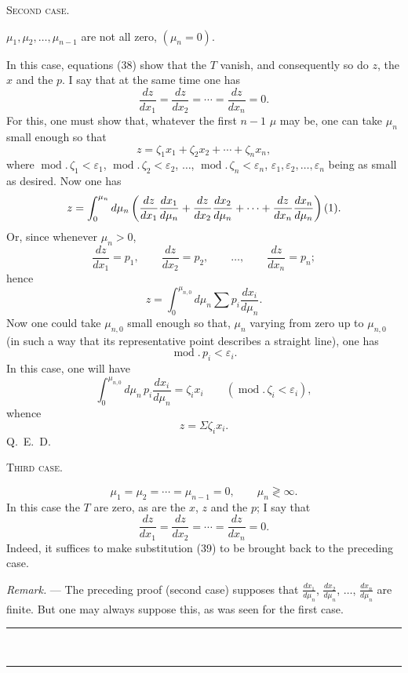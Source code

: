 \documentclass[11pt]{article}
\newcommand{\ornament}{\begin{center}\rule{2.5em}{0.4pt}\,\raisebox{0.1ex}{\tiny$\bullet\bullet\bullet$}\,\rule{2.5em}{0.4pt}\end{center}}
\begin{document}
\begin{center}
{\scshape Second case.}
\end{center}

$\mu_1,\mu_2,\ldots,\mu_{n-1}$ are not all zero, $(\mu_n=0)$.

In this case, equations (38) show that the $T$ vanish, and consequently so do $z$, the $x$ and the $p$. I say that at the same time one has
\[
\frac{dz}{dx_1}=\frac{dz}{dx_2}=\cdots=\frac{dz}{dx_n}=0.
\]
For this, one must show that, whatever the first $n-1$ $\mu$ may be, one can take $\mu_n$ small enough so that
\[
z=\zeta_1x_1+\zeta_2x_2+\cdots+\zeta_nx_n,
\]
where $\operatorname{mod}.\,\zeta_1<\varepsilon_1$, $\operatorname{mod}.\,\zeta_2<\varepsilon_2$, $\ldots$, $\operatorname{mod}.\,\zeta_n<\varepsilon_n$, $\varepsilon_1,\varepsilon_2,\ldots,\varepsilon_n$ being as small as desired. Now one has
\[
z=\int_0^{\mu_n}d\mu_n\left(\frac{dz}{dx_1}\frac{dx_1}{d\mu_n}+\frac{dz}{dx_2}\frac{dx_2}{d\mu_n}+\cdots+\frac{dz}{dx_n}\frac{dx_n}{d\mu_n}\right)\textup{(1)}.
\]
\begingroup
\renewcommand{\thefootnote}{(1)}
\endgroup
Or, since whenever $\mu_n>0$,
\[
\frac{dz}{dx_1}=p_1,
\qquad
\frac{dz}{dx_2}=p_2,
\qquad \ldots,
\qquad
\frac{dz}{dx_n}=p_n;
\]
hence
\[
z=\int_0^{\mu_{n,0}}d\mu_n\sum p_i\frac{dx_i}{d\mu_n}.
\]
Now one could take $\mu_{n,0}$ small enough so that, $\mu_n$ varying from zero up to $\mu_{n,0}$ (in such a way that its representative point describes a straight line), one has
\[
\operatorname{mod}.\,p_i<\varepsilon_i.
\]
In this case, one will have
\[
\int_0^{\mu_{n,0}}d\mu_n\,p_i\frac{dx_i}{d\mu_n}=\zeta_i x_i
\qquad(\operatorname{mod}.\,\zeta_i<\varepsilon_i),
\]
whence
\[
z=\Sigma\zeta_i x_i.
\]
\hfill\mbox{Q. E. D.}

\begin{center}
{\scshape Third case.}
\end{center}
\[
\mu_1=\mu_2=\cdots=\mu_{n-1}=0,
\qquad
\mu_n\gtrless\infty.
\]
In this case the $T$ are zero, as are the $x$, $z$ and the $p$; I say that
\[
\frac{dz}{dx_1}=\frac{dz}{dx_2}=\cdots=\frac{dz}{dx_n}=0.
\]
Indeed, it suffices to make substitution (39) to be brought back to the preceding case.

\emph{Remark.} --- The preceding proof (second case) supposes that $\frac{dx_1}{d\mu_n}$, $\frac{dx_2}{d\mu_n}$, $\ldots$, $\frac{dx_n}{d\mu_n}$ are finite. But one may always suppose this, as was seen for the first case.

\ornament
\end{document}
